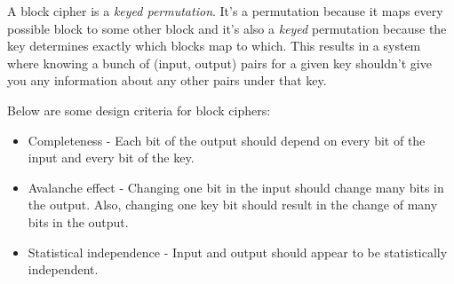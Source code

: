 \documentclass{article}
\begin{document}
A block cipher is a \textit{keyed permutation}. It's a permutation because it maps every possible block to some other block and it's also a \textit{keyed} permutation because the key determines exactly which blocks map to which. This results in a system where knowing a bunch of (input, output) pairs for a given key shouldn't give you any information about any other pairs under that key.

Below are some design criteria for block ciphers:
\begin{itemize}
	\item Completeness - Each bit of the output should depend on every bit of the input and every bit of the key.
	\item Avalanche effect - Changing one bit in the input should change many bits in the output. Also, changing one key bit should result in the change of many bits in the output.
	\item Statistical independence - Input and output should appear to be statistically independent.
\end{itemize}
\end{document}
